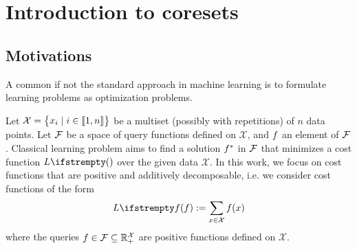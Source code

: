 
\chapter{Introduction to coresets}

\section{Motivations}




A common if not the standard approach in machine learning
is to formulate learning problems as optimization problems.

Let $\mathcal{X}=\begin{Bmatrix}
x_{i} \mid i\in \llbracket 1,n \rrbracket
\end{Bmatrix}$ be a multiset (possibly with repetitions) of $n$ data points. Let $\mathcal{F}$ be a space of query functions defined on $\mathcal{X}$, and $f$ an element of $\mathcal{F}$. Classical learning problem aims to find a solution $f ^*$ in $\mathcal{F}$ that minimizes a cost function $\loss{}$ over the given data $\mathcal{X}$. In this work, we focus on cost functions that are positive and additively decomposable, i.e. we consider cost functions of the form
\begin{equation*}
\loss{\query}:=\sum_{x \in \mathcal{X}} \query (x)
\end{equation*}
where the queries $f \in \mathcal{F} \subseteq \mathbb{R}_+^{\mathcal{X}}$ are positive functions defined on $\mathcal{X}$.

